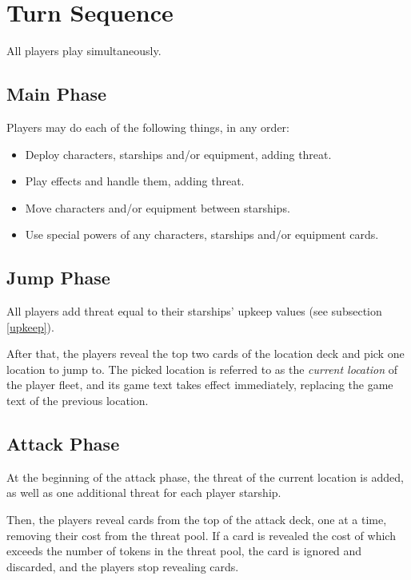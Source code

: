 \documentclass[11pt, a4paper]{article}
\begin{document}
\section{Turn Sequence}

All players play simultaneously.

\subsection{Main Phase}

Players may do each of the following things, in any order:

\begin{itemize}
 \item Deploy characters, starships and/or equipment, adding threat.
 \item Play effects and handle them, adding threat.
 \item Move characters and/or equipment between starships.
 \item Use special powers of any characters, starships and/or equipment cards.
\end{itemize}

\subsection{Jump Phase}

All players add threat equal to their starships' upkeep values (see subsection
\ref{upkeep}).

After that, the players reveal the top two cards of the location deck and pick
one location to jump to. The picked location is referred to as the
\emph{current location} of the player fleet, and its game text takes effect
immediately, replacing the game text of the previous location.

\subsection{Attack Phase}

At the beginning of the attack phase, the threat of the current location is
added, as well as one additional threat for each player starship.

Then, the players reveal cards from the top of the attack deck, one at a time,
removing their cost from the threat pool. If a card is revealed the cost of
which exceeds the number of tokens in the threat pool, the card is ignored and
discarded, and the players stop revealing cards.
\end{document}
